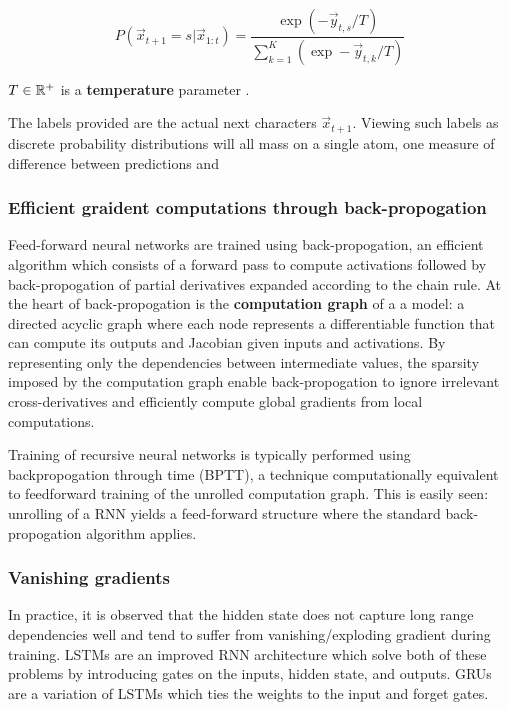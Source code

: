 \begin{equation}
    \label{eq:boltzmann-dist}
    P(\vec{x}_{t+1} = s | \vec{x}_{1:t})
    = \frac{\exp \left(-\vec{y}_{t,s}/T\right) }{ \sum_{k=1}^{K} \left(\exp -\vec{y}_{t,k}/T\right)}
\end{equation}

$T \in \mathbb{R}^+$ is a \textbf{temperature} parameter .

The labels provided are the actual next characters $\vec{x}_{t+1}$. Viewing
such labels as discrete probability distributions will all mass on a single atom,
one measure of difference between predictions and 

\subsubsection{Efficient graident computations through back-propogation}

Feed-forward neural networks are trained using back-propogation, an efficient
algorithm which consists of a forward pass to compute activations followed by
back-propogation of partial derivatives expanded according to the chain
rule. At the heart of back-propogation is the
\textbf{computation graph} of a a model: a directed acyclic graph where each
node represents a differentiable function that can compute its outputs and
Jacobian given inputs and activations. By representing only
the dependencies between intermediate values, the sparsity imposed by the
computation graph enable back-propogation to ignore irrelevant
cross-derivatives and efficiently compute global gradients from local
computations.


Training of recursive neural networks is typically performed using
backpropogation through time (BPTT)\cite{at}, a technique computationally
equivalent to feedforward training of the unrolled computation graph. This is
easily seen: unrolling of a RNN yields a feed-forward structure where the
standard back-propogation algorithm applies.




\subsubsection{Vanishing gradients}

In practice, it is observed that the hidden state does not capture long range
dependencies well and tend to suffer from vanishing/exploding gradient during
training. LSTMs are an improved RNN architecture which solve both of these
problems by introducing gates on the inputs, hidden state, and outputs. GRUs are
a variation of LSTMs which ties the weights to the input and forget gates.


